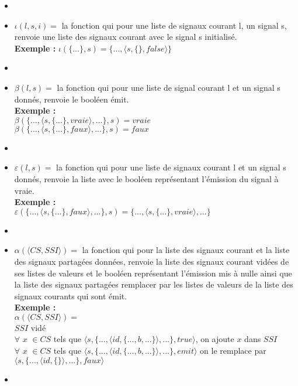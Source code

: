 \documentclass[10pt,a4paper]{article}
\begin{document}
\begin{itemize}
				\item[]
				\item[] $\iota(l,s,i) =$ la fonction qui pour une liste de signaux courant l, un signal s, renvoie une liste des signaux courant avec le signal s initialisé.
				\\\textbf{Exemple :} $\iota(\{...\},s) = \{...,\langle s,\{\},false\rangle\}$
				\item[]
				\item[] $\beta(l,s) =$ la fonction qui pour une liste de signal courant l et un signal s donnés, renvoie le booléen émit.
				\\\textbf{Exemple :}
				\\ $\beta(\{...,\langle s,\{...\},vraie\rangle,...\},s) = vraie$\\
				$\beta(\{...,\langle s,\{...\},faux\rangle,...\},s) = faux$
				\item[] 
				\item[] $\varepsilon(l,s) =$ la fonction qui pour une liste de signaux courant l et un signal s donnés, renvoie la liste avec le booléen représentant l'émission du signal à vraie.
				\\\textbf{Exemple :}
				\\ $\varepsilon(\{...,\langle s,\{...\},faux\rangle,...\},s) = \{...,\langle s,\{...\},vraie\rangle,...\}$
				\item[] 
				\item[] $\alpha(\langle CS,SSI\rangle) =$ la fonction qui pour la liste des signaux courant et la liste des signaux partagées données, renvoie la liste des signaux courant vidées de ses listes de valeurs et le booléen représentant l'émission mis à nulle ainsi que la liste des signaux partagées remplacer par les listes de valeurs de la liste des signaux courants qui sont émit.
				\\\textbf{Exemple :}
				\\ $\alpha(\langle CS,SSI\rangle) =$
				\\ $SSI$ vidé
				\\ $\forall$ $x$ $\in CS$ tels que $\langle s,\{...,\langle id,\{...,b,...\}\rangle,...\},true\rangle$, on ajoute $x$ dans $SSI$
				\\ $\forall$ $x$ $\in CS$ tels que $\langle s,\{...,\langle id,\{...,b,...\}\rangle,...\},emit\rangle$ on le remplace par $\langle s,\{...,\langle id,\{\}\rangle,...\},faux\rangle$ 
				\item[] 
			\end{itemize}
			\newpage
			
\end{document}
